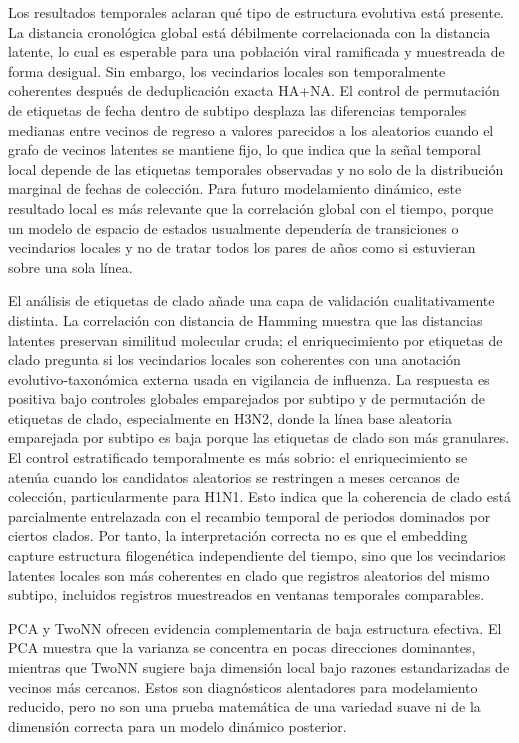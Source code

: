 \documentclass[11pt]{article}
\begin{document}
Los resultados temporales aclaran qué tipo de estructura evolutiva está presente. La distancia cronológica global está débilmente correlacionada con la distancia latente, lo cual es esperable para una población viral ramificada y muestreada de forma desigual. Sin embargo, los vecindarios locales son temporalmente coherentes después de deduplicación exacta HA+NA. El control de permutación de etiquetas de fecha dentro de subtipo desplaza las diferencias temporales medianas entre vecinos de regreso a valores parecidos a los aleatorios cuando el grafo de vecinos latentes se mantiene fijo, lo que indica que la señal temporal local depende de las etiquetas temporales observadas y no solo de la distribución marginal de fechas de colección. Para futuro modelamiento dinámico, este resultado local es más relevante que la correlación global con el tiempo, porque un modelo de espacio de estados usualmente dependería de transiciones o vecindarios locales y no de tratar todos los pares de años como si estuvieran sobre una sola línea.

El análisis de etiquetas de clado añade una capa de validación cualitativamente distinta. La correlación con distancia de Hamming muestra que las distancias latentes preservan similitud molecular cruda; el enriquecimiento por etiquetas de clado pregunta si los vecindarios locales son coherentes con una anotación evolutivo-taxonómica externa usada en vigilancia de influenza. La respuesta es positiva bajo controles globales emparejados por subtipo y de permutación de etiquetas de clado, especialmente en H3N2, donde la línea base aleatoria emparejada por subtipo es baja porque las etiquetas de clado son más granulares. El control estratificado temporalmente es más sobrio: el enriquecimiento se atenúa cuando los candidatos aleatorios se restringen a meses cercanos de colección, particularmente para H1N1. Esto indica que la coherencia de clado está parcialmente entrelazada con el recambio temporal de periodos dominados por ciertos clados. Por tanto, la interpretación correcta no es que el embedding capture estructura filogenética independiente del tiempo, sino que los vecindarios latentes locales son más coherentes en clado que registros aleatorios del mismo subtipo, incluidos registros muestreados en ventanas temporales comparables.

PCA y TwoNN ofrecen evidencia complementaria de baja estructura efectiva. El PCA muestra que la varianza se concentra en pocas direcciones dominantes, mientras que TwoNN sugiere baja dimensión local bajo razones estandarizadas de vecinos más cercanos. Estos son diagnósticos alentadores para modelamiento reducido, pero no son una prueba matemática de una variedad suave ni de la dimensión correcta para un modelo dinámico posterior.
\end{document}
